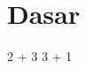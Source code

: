 \documentclass[a4paper,bahasa]{extbook}
\begin{document}
\chapter{Dasar}

\begin{mathematicacode}
2 + 3
3 + 1
\end{mathematicacode}

\inputminted{mathematica}{01_dasar.mma}
\end{document}
